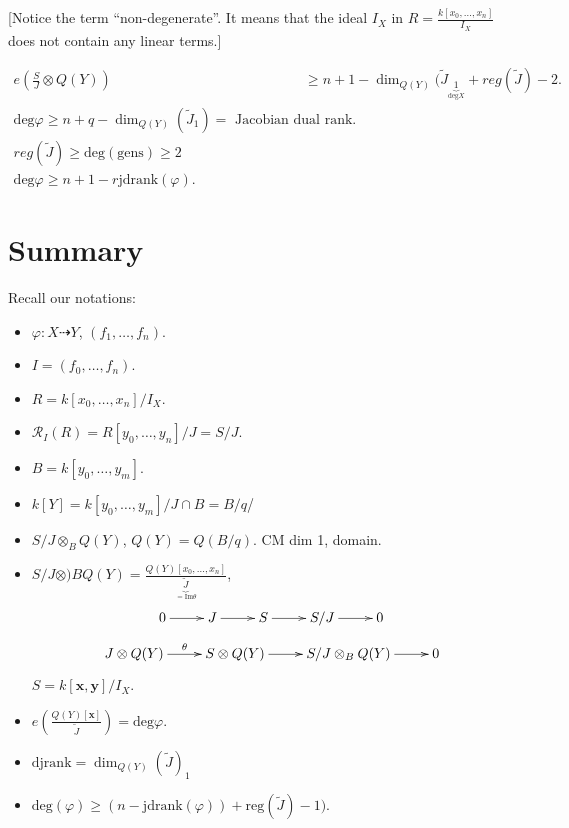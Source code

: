 [Notice the term ``non-degenerate''. It means
that
the ideal $I_X$ in
$R=\frac{k[x_0,…,x_n]}{I_X}$
does not contain any linear terms.]

$$
\begin{aligned}
e\left(\frac{S}{J}\otimes Q(Y)\right) &\geq
n+1-
\dim_{Q(Y)}(\tilde{J}_{\underbrace{1}
_{\text{deg}
X}}
+reg(\tilde{J})-2.\\
\text{deg}\varphi\geq
n+q-\dim_{Q(Y)}(\tilde{J}_1)
=\text{ Jacobian dual rank}.\\
reg(\tilde{J}) \geq
\text{deg}(\text{gens})\geq 2\\
\text{deg}\varphi\geq n+1-r
\text{jdrank}(\varphi).
\end{aligned}
$$



\section{Summary}
\label{section-summary-duplicate-2}

Recall our notations:
\begin{itemize}
\item $\varphi:X \dashrightarrow Y$,
$(f_1,…,f_n)$.

\item $I=(f_0,…,f_n)$.

\item $R=k[x_0,…,x_n]/I_X$.

\item $\mathcal{R}_I(R)=R[y_0,…,y_n]/J=S/J$.

\item $B=k[y_0,…,y_m]$.

\item $k[Y]=k[y_0,…,y_m]/J\cap B=B/q$/

\item $S/J \otimes_B Q(Y)$, $Q(Y)=Q(B/q)$. CM
dim 1, domain.

 \item $S/J \otimes )B Q(Y)
=\frac{Q(Y)[x_0,…,x_n]}{\underbrace{\tilde{J}
}_{=\text{Im}\theta}}$,
$$
\xymatrix{
0\ar[r]
&J\ar[r]
&S\ar[r]
&S/J\ar[r]
&0
}
$$
$$
\xymatrix{
J \otimes Q(Y)\ar[r]^{\theta}
&S \otimes Q(Y)\ar[r]
&S/J \otimes_B Q(Y)\ar[r]
&0
}
$$
$S=k[\mathbf{x},\mathbf{y}]/I_X$.

\item
$e\left(\frac{Q(Y)[\mathbf{x}]}{\tilde{J}}
\right)=\text{deg}\varphi$.

\item
$\text{djrank}=\dim_{Q(Y)}(\tilde{J})_1$

\item $\text{deg}(\varphi)\geq
(n-\text{jdrank}(\varphi))
+\text{reg}(\tilde{J})-1)$.
\end{itemize}



